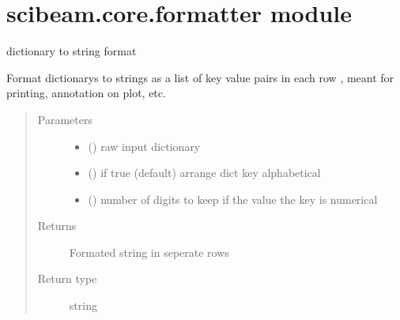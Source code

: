 \documentclass[letterpaper,10pt,english]{sphinxmanual}
\begin{document}
\section{scibeam.core.formatter module}
\label{\detokenize{scibeam.core:module-scibeam.core.formatter}}\label{\detokenize{scibeam.core:scibeam-core-formatter-module}}

\begin{fulllineitems}
\label{\detokenize{scibeam.core:scibeam.core.formatter.format_dict}}
dictionary to string format

Format dictionarys to strings as a list of key value pairs in each row ,
meant for printing, annotation on plot, etc.
\begin{quote}\begin{description}
\item[{Parameters}] \leavevmode\begin{itemize}
\item {} 
 () \textendash{} raw input dictionary

\item {} 
 () \textendash{} if true (default) arrange dict key alphabetical

\item {} 
 () \textendash{} number of digits to keep if the value the key is numerical

\end{itemize}

\item[{Returns}] \leavevmode
Formated string in seperate rows

\item[{Return type}] \leavevmode
string

\end{description}\end{quote}

\end{fulllineitems}
\end{document}
